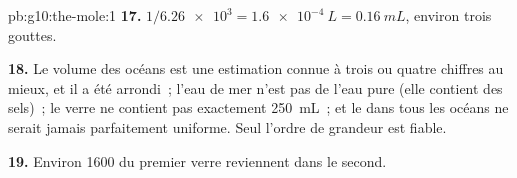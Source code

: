 \begin{solution}{pb:g10:the-mole:1}
\textbf{17.} $1 / \num{6.26e3} = \qty{1.6e-4}{L} = \qty{0.16}{mL}$,
environ trois gouttes.

\textbf{18.} Le volume des océans est une estimation connue à trois ou
quatre chiffres au mieux, et il a été arrondi~; l'eau de mer n'est pas
de l'eau pure (elle contient des sels)~; le verre ne contient pas
exactement \qty{250}{mL}~; et le  dans tous les océans ne serait
jamais parfaitement uniforme. Seul l'ordre de grandeur est fiable.

\textbf{19.} Environ 1600  du premier verre reviennent dans le
second.
\end{solution}
